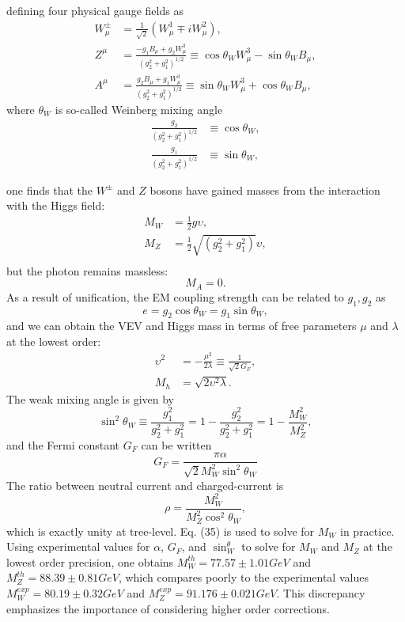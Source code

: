 \documentclass[secnumarabic, graphics,floatfix,nofootinbib,amsmath
tightenlines,nobibnotes,aps,prl,12pt]{revtex4-1}
\newcommand{\beeq}{\begin{equation}}
\newcommand{\eeeq}{\end{equation}}
\begin{document}
defining four physical gauge fields as 
\begin{align}
W^{\pm}_{\mu}&=\frac{1}{\sqrt{2}}(W^1_{\mu}\mp iW^2_{\mu}),\\
Z^{\mu}&=\frac{-g_1B_{\mu}+g_2W^3_{\mu}}{(g_2^2+g_1^2)^{1/2}}\equiv \cos \theta_W W^3_{\mu}-\sin \theta_W B_{\mu},\\
A^{\mu}&=\frac{g_2B_{\mu}+g_1W^3_{\mu}}{(g_2^2+g_1^2)^{1/2}}\equiv \sin \theta_WW^3_{\mu}+\cos \theta_W B_{\mu},
\end{align}
where $\theta_W$ is so-called Weinberg mixing angle
\begin{align}
\frac{g_2}{(g_2^2+g_1^2)^{1/2}}&\equiv \cos \theta_W,\\
\frac{g_1}{(g_2^2+g_1^2)^{1/2}}&\equiv \sin \theta_W,
\end{align}

one finds that the $W^{\pm}$ and $Z$ bosons have gained masses from the interaction with the Higgs field:
\begin{align}
M_W&=\frac{1}{2}g\upsilon,\\
M_Z&=\frac{1}{2}\sqrt{(g_2^2+g_1^2)}\upsilon,\\
\end{align}
but the photon remains massless:
\begin{equation}
M_A=0.
\end{equation}
As a result of unification, the EM coupling strength can be related to $g_1, g_2$ as
\begin{equation}
e=g_2\cos \theta_W=g_1\sin \theta_W,
\end{equation}
and we can obtain the VEV and Higgs mass in terms of free parameters $\mu$ and $\lambda$ at the lowest order:
\begin{align}
\upsilon^2&=-\frac{\mu^2}{2\lambda}\equiv \frac{1}{\sqrt{2}G_F},\\
M_h&=\sqrt{2\upsilon^2\lambda}.
\end{align}
The weak mixing angle is given by
\beeq
\sin^2\theta_W\equiv \frac{g_1^2}{g_2^2+g_1^2}=1-\frac{g_2^2}{g_2^2+g_1^2}=1-\frac{M_W^2}{M_Z^2},
\eeeq
and the Fermi constant $G_F$ can be written 
\beeq
G_F=\frac{\pi \alpha}{\sqrt{2}M_W^2 \sin^2{\theta_W}}
\eeeq
The ratio between neutral current and charged-current is 
\beeq
\rho=\frac{M_W^2}{M_Z^2\cos^2{\theta_W}},
\eeeq
which is exactly unity at tree-level.  Eq. (35) is used to solve for $M_W$ in practice. Using experimental values for $\alpha$, $G_F$, and $\sin^\theta_W$ to solve for $M_W$ and $M_Z$ at the lowest order precision, one obtains $M_W^{th}=77.57\pm 1.01GeV$ and $M_Z^{th}=88.39\pm0.81GeV$, which compares poorly to the experimental values $M_W^{exp}=80.19\pm0.32GeV$ and $M_Z^{exp}=91.176\pm0.021GeV$. This discrepancy emphasizes the importance of considering higher order corrections. 
\end{document}
